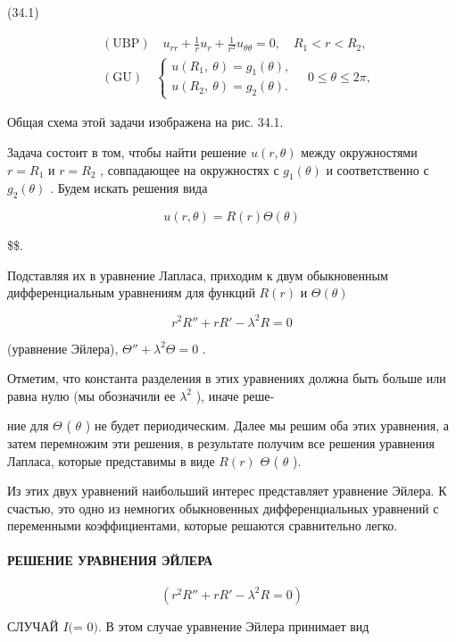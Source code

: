\documentclass[
  ukrainian,
]{article}
\begin{document}
(34.1)

\[
\begin{aligned} & (\text{UBP}) \quad u_{rr} + \frac{1}{r} u_r + \frac{1}{r^2} u_{\theta\theta} = 0, \quad R_1 < r < R_2, \\ & (\text{GU}) \quad \begin{cases} u(R_1, \ \theta) = g_1(\theta), \\ u(R_2, \ \theta) = g_2(\theta). \end{cases} \quad 0 \leqslant \theta \leqslant 2\pi, \end{aligned}
\]

Общая схема этой задачи изображена на рис. 34.1.

Задача состоит в том, чтобы найти решение \(u(r, \theta)\) между
окружностями \(r = R_1\) и \(r = R_2\) , совпадающее на окружностях с
\(g_1(\theta)\) и соответственно с \(g_2(\theta)\) . Будем искать
решения вида

\[
u(r, \theta) = R(r) \Theta(\theta)
\]

\$\$.

Подставляя их в уравнение Лапласа, приходим к двум обыкновенным
дифференциальным уравнениям для функций \(R(r)\) и \(\Theta(\theta)\)

\[
r^2R'' + rR' - \lambda^2R = 0
\]

(уравнение Эйлера), \(\Theta'' + \lambda^2\Theta = 0\) .

Отметим, что константа разделения в этих уравнениях должна быть больше
или равна нулю (мы обозначили ее \(\lambda^2\) ), иначе реше-

ние для \(\Theta\) ( \(\theta\) ) не будет периодическим. Далее мы решим
оба этих уравнения, а затем перемножим эти решения, в результате получим
все решения уравнения Лапласа, которые представимы в виде \(R (r)\)
\(\Theta\) ( \(\theta\) ).

Из этих двух уравнений наибольший интерес представляет уравнение Эйлера.
К счастью, это одно из немногих обыкновенных дифференциальных уравнений
с переменными коэффициентами, которые решаются сравнительно легко.

\paragraph{РЕШЕНИЕ УРАВНЕНИЯ
ЭЙЛЕРА}\label{ux440ux435ux448ux435ux43dux438ux435-ux443ux440ux430ux432ux43dux435ux43dux438ux44f-ux44dux439ux43bux435ux440ux430}

\[
(r^2R'' + rR' - \lambda^2R = 0)
\]

СЛУЧАЙ \(I (\)\lambda = 0\()\). В этом случае уравнение Эйлера принимает
вид
\end{document}
